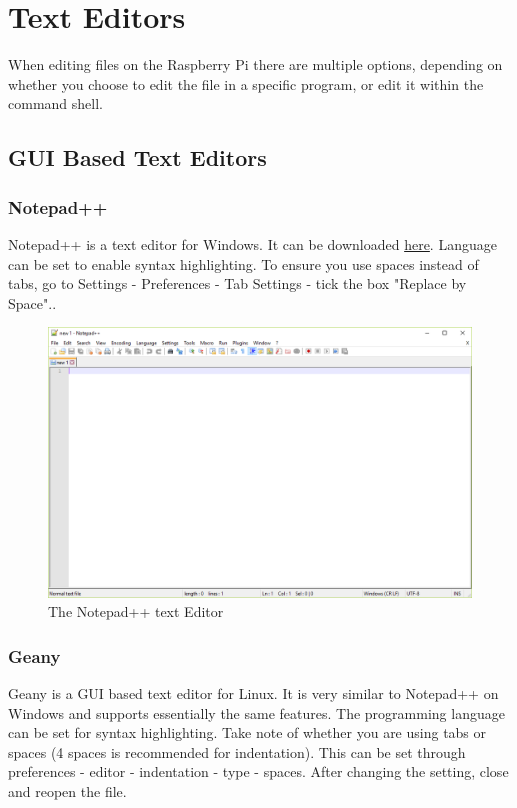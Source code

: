 \section{Text Editors}
When editing files on the Raspberry Pi there are multiple options, depending on whether you choose to edit the file in a specific program, or edit it within the command shell.

\subsection{GUI Based Text Editors}
\subsubsection{Notepad++}
Notepad++ is a text editor for Windows. It can be downloaded \href{https://notepad-plus-plus.org/download}{here}. Language can be set to enable syntax highlighting. To ensure you use spaces instead of tabs, go to Settings - Preferences - Tab Settings - tick the box "Replace by Space"..

\begin{figure}[H]
\centering
\includegraphics[width=0.6\columnwidth]{Figures/notepad++}
\caption{The Notepad++ text Editor}
\label{fig:notepad++}
\end{figure}

\subsubsection{Geany}
Geany is a GUI based text editor for Linux. It is very similar to Notepad++ on Windows and supports essentially the same features. The programming language can be set for syntax highlighting. Take note of whether you are using tabs or spaces (4 spaces is recommended for indentation). This can be set through preferences - editor - indentation - type - spaces. After changing the setting, close and reopen the file.

